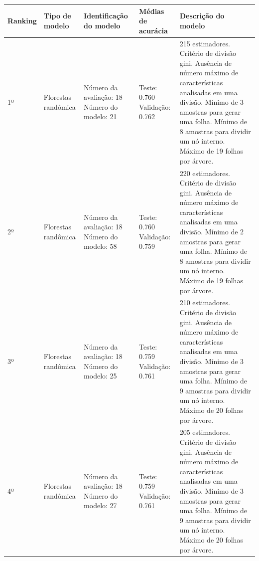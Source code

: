 \begin{table}[ht!]
  \begin{center}
  \setlength{\belowcaptionskip}{10pt}
  \footnotesize {
    \begin{tabular}{|p{1.25cm}|p{2cm}|p{2cm}|p{2.5cm}|p{6.75cm}|}
	  \hline
	  \textbf{Ranking} & \textbf{Tipo de \newline modelo} & \textbf{Identificação do modelo} & \textbf{Médias de \newline acurácia} & \textbf{Descrição do modelo} \\
	  \hline
    1º & Florestas randômica & Número da \newline avaliação: 18 \newline Número do \newline modelo: 21 & Teste: 0.760 \newline Validação: 0.762 & 215 estimadores. Critério de divisão gini. Ausência de número máximo de características analisadas em uma divisão. Mínimo de 3 amostras para gerar uma folha. Mínimo de 8 amostras para dividir um nó interno. Máximo de 19 folhas por árvore. \\
    \hline
    2º & Florestas randômica & Número da \newline avaliação: 18 \newline Número do \newline modelo: 58 & Teste: 0.760 \newline Validação: 0.759 & 220 estimadores. Critério de divisão gini. Ausência de número máximo de características analisadas em uma divisão. Mínimo de 2 amostras para gerar uma folha. Mínimo de 8 amostras para dividir um nó interno. Máximo de 19 folhas por árvore. \\
    \hline
    3º & Florestas randômica & Número da \newline avaliação: 18 \newline Número do \newline modelo: 25 & Teste: 0.759 \newline Validação: 0.761 & 210 estimadores. Critério de divisão gini. Ausência de número máximo de características analisadas em uma divisão. Mínimo de 3 amostras para gerar uma folha. Mínimo de 9 amostras para dividir um nó interno. Máximo de 20 folhas por árvore. \\
    \hline
    4º & Florestas randômica & Número da \newline avaliação: 18 \newline Número do \newline modelo: 27 & Teste: 0.759 \newline Validação: 0.761 & 205 estimadores. Critério de divisão gini. Ausência de número máximo de características analisadas em uma divisão. Mínimo de 3 amostras para gerar uma folha. Mínimo de 9 amostras para dividir um nó interno. Máximo de 20 folhas por árvore. \\

\end{tabular}}
\end{center}
\end{table}
